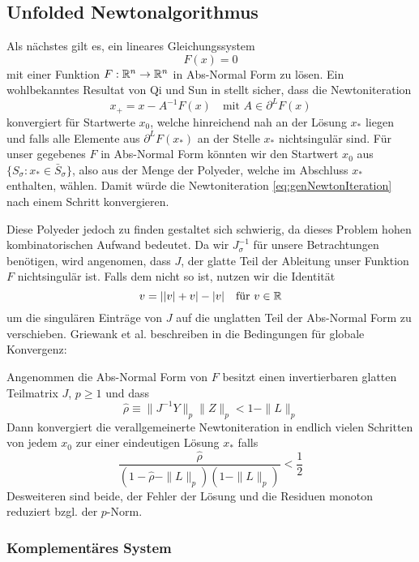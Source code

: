 \subsection{Unfolded Newtonalgorithmus}
Als nächstes gilt es, ein lineares Gleichungssystem 
\[
 F(x) = 0
\]
mit einer Funktion  $F:\mathbb{R}^n \to \mathbb{R}^n$ in Abs-Normal Form zu lösen.
Ein wohlbekanntes Resultat von Qi und Sun in \cite{qi1993nonsmooth} stellt sicher, dass die Newtoniteration
\begin{equation}
\label{eq:genNewtonIteration}
 x_+ = x- A^{-1}F(x)\quad \text{mit } A \in \partial^LF(x)
\end{equation}
konvergiert für Startwerte $x_0$, welche hinreichend nah an der Lösung $x_*$ liegen und falls alle Elemente aus $\partial^L F(x_*)$ an der Stelle $x_*$ nichtsingulär sind. 
Für unser gegebenes $F$ in Abs-Normal Form könnten wir den Startwert $x_0$ aus $\lbrace S_\sigma:x_*\in \bar S_\sigma \rbrace$, also aus der Menge der Polyeder, welche im Abschluss  $x_*$ enthalten, wählen. Damit würde die Newtoniteration \eqref{eq:genNewtonIteration} nach einem Schritt konvergieren. 

Diese Polyeder jedoch zu finden gestaltet sich schwierig, da dieses Problem hohen kombinatorischen Aufwand bedeutet. 
Da wir $J_\sigma^{-1}$ für unsere Betrachtungen benötigen, wird angenomen, dass $J$, der glatte Teil der Ableitung unser Funktion $F$ nichtsingulär ist. Falls dem nicht so ist, nutzen wir die Identität
\[
 v = | |v| + v| - |v | \quad \text{für } v\in\mathbb{R}
\]
um die singulären Einträge von $J$ auf die unglatten Teil der Abs-Normal Form zu verschieben.
Griewank et al. beschreiben in \cite[Prop.5.2]{plan} die Bedingungen für globale Konvergenz:

\begin{theorem}
 Angenommen die Abs-Normal Form von $F$ besitzt einen invertierbaren glatten Teilmatrix $J$, $p\geq 1$ und dass
 \[
  \hat \rho \equiv \| J^{-1}Y \|_p \|Z\|_p < 1 - \|L\|_p
 \]
 Dann konvergiert die verallgemeinerte Newtoniteration in endlich vielen Schritten von jedem $x_0$ zur einer eindeutigen Lösung $x_*$ falls
 \[
  \frac{\hat \rho}{(1-\hat \rho - \|L\|_p)(1-\|L\|_p)} < \frac{1}{2}
 \]
Desweiteren sind beide, der Fehler der Lösung und die Residuen monoton reduziert bzgl. der $p$-Norm.
\end{theorem}

\subsubsection{Komplementäres System}

